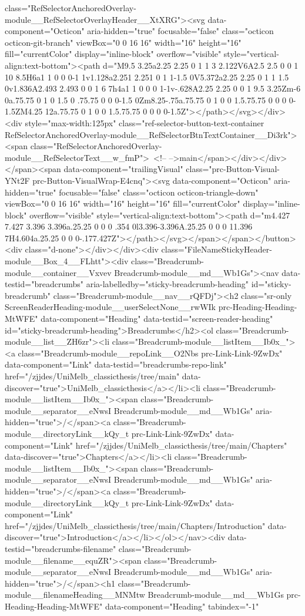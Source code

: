 {{{{{class="RefSelectorAnchoredOverlay-module__RefSelectorOverlayHeader__XtXRG"><svg data-component="Octicon" aria-hidden="true" focusable="false" class="octicon octicon-git-branch" viewBox="0 0 16 16" width="16" height="16" fill="currentColor" display="inline-block" overflow="visible" style="vertical-align:text-bottom"><path d="M9.5 3.25a2.25 2.25 0 1 1 3 2.122V6A2.5 2.5 0 0 1 10 8.5H6a1 1 0 0 0-1 1v1.128a2.251 2.251 0 1 1-1.5 0V5.372a2.25 2.25 0 1 1 1.5 0v1.836A2.493 2.493 0 0 1 6 7h4a1 1 0 0 0 1-1v-.628A2.25 2.25 0 0 1 9.5 3.25Zm-6 0a.75.75 0 1 0 1.5 0 .75.75 0 0 0-1.5 0Zm8.25-.75a.75.75 0 1 0 0 1.5.75.75 0 0 0 0-1.5ZM4.25 12a.75.75 0 1 0 0 1.5.75.75 0 0 0 0-1.5Z"></path></svg></div><div style="max-width:125px" class="ref-selector-button-text-container RefSelectorAnchoredOverlay-module__RefSelectorBtnTextContainer__Di3rk"><span class="RefSelectorAnchoredOverlay-module__RefSelectorText__w_fmP"> <!-- -->main</span></div></div></span><span data-component="trailingVisual" class="prc-Button-Visual-YNt2F prc-Button-VisualWrap-E4cnq"><svg data-component="Octicon" aria-hidden="true" focusable="false" class="octicon octicon-triangle-down" viewBox="0 0 16 16" width="16" height="16" fill="currentColor" display="inline-block" overflow="visible" style="vertical-align:text-bottom"><path d="m4.427 7.427 3.396 3.396a.25.25 0 0 0 .354 0l3.396-3.396A.25.25 0 0 0 11.396 7H4.604a.25.25 0 0 0-.177.427Z"></path></svg></span></span></button><div class="d-none"></div></div><div class="FileNameStickyHeader-module__Box_4__FLhtt"><div class="Breadcrumb-module__container__Vxvev Breadcrumb-module__md__Wb1Gs"><nav data-testid="breadcrumbs" aria-labelledby="sticky-breadcrumb-heading" id="sticky-breadcrumb" class="Breadcrumb-module__nav__rQFDj"><h2 class="sr-only ScreenReaderHeading-module__userSelectNone__rwWIk prc-Heading-Heading-MtWFE" data-component="Heading" data-testid="screen-reader-heading" id="sticky-breadcrumb-heading">Breadcrumbs</h2><ol class="Breadcrumb-module__list__ZH6zr"><li class="Breadcrumb-module__listItem__Ib0x_"><a class="Breadcrumb-module__repoLink__O2Nbs prc-Link-Link-9ZwDx" data-component="Link" data-testid="breadcrumbs-repo-link" href="/zjjdes/UniMelb_classicthesis/tree/main" data-discover="true">UniMelb_classicthesis</a></li><li class="Breadcrumb-module__listItem__Ib0x_"><span class="Breadcrumb-module__separator__eNwsI Breadcrumb-module__md__Wb1Gs" aria-hidden="true">/</span><a class="Breadcrumb-module__directoryLink__kQy_t prc-Link-Link-9ZwDx" data-component="Link" href="/zjjdes/UniMelb_classicthesis/tree/main/Chapters" data-discover="true">Chapters</a></li><li class="Breadcrumb-module__listItem__Ib0x_"><span class="Breadcrumb-module__separator__eNwsI Breadcrumb-module__md__Wb1Gs" aria-hidden="true">/</span><a class="Breadcrumb-module__directoryLink__kQy_t prc-Link-Link-9ZwDx" data-component="Link" href="/zjjdes/UniMelb_classicthesis/tree/main/Chapters/Introduction" data-discover="true">Introduction</a></li></ol></nav><div data-testid="breadcrumbs-filename" class="Breadcrumb-module__filename__equZR"><span class="Breadcrumb-module__separator__eNwsI Breadcrumb-module__md__Wb1Gs" aria-hidden="true">/</span><h1 class="Breadcrumb-module__filenameHeading__MNMtw Breadcrumb-module__md__Wb1Gs prc-Heading-Heading-MtWFE" data-component="Heading" tabindex="-1" }}}}}
